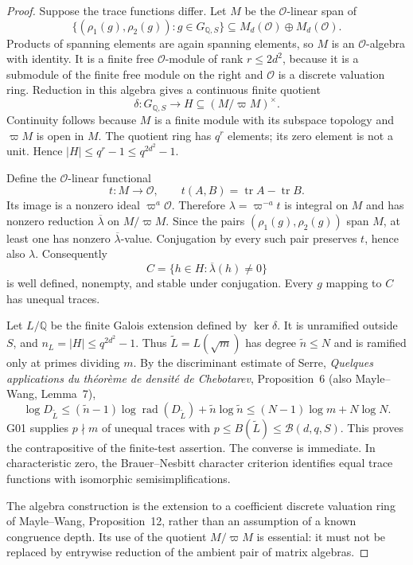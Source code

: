 \documentclass[11pt,a4paper]{article}
\begin{document}
\begin{proof}
Suppose the trace functions differ.  Let $M$ be the $\mathcal O$-linear span of
\[
 \{(\rho_1(g),\rho_2(g)):g\in G_{\mathbb Q,S}\}
 \subseteq M_d(\mathcal O)\oplus M_d(\mathcal O).
\]
Products of spanning elements are again spanning elements, so $M$ is an $\mathcal O$-algebra with identity. It is a finite free $\mathcal O$-module of rank $r\le2d^2$, because it is a submodule of the finite free module on the right and $\mathcal O$ is a discrete valuation ring.  Reduction in this algebra gives a continuous finite quotient
\[
 \delta:G_{\mathbb Q,S}\longrightarrow H\subseteq(M/\varpi M)^\times.
\]
Continuity follows because $M$ is a finite module with its subspace topology and $\varpi M$ is open in $M$.  The quotient ring has $q^r$ elements; its zero element is not a unit. Hence $|H|\le q^r-1\le q^{2d^2}-1$.

Define the $\mathcal O$-linear functional
\[
 t:M\longrightarrow\mathcal O,\qquad t(A,B)=\operatorname{tr}A-\operatorname{tr}B.
\]
Its image is a nonzero ideal $\varpi^a\mathcal O$. Therefore $\lambda=\varpi^{-a}t$ is integral on $M$ and has nonzero reduction $\overline\lambda$ on $M/\varpi M$. Since the pairs $(\rho_1(g),\rho_2(g))$ span $M$, at least one has nonzero $\overline\lambda$-value. Conjugation by every such pair preserves $t$, hence also $\lambda$. Consequently
\[
 C=\{h\in H:\overline\lambda(h)\ne0\}
\]
is well defined, nonempty, and stable under conjugation. Every $g$ mapping to $C$ has unequal traces.

Let $L/\mathbb Q$ be the finite Galois extension defined by $\ker\delta$. It is unramified outside $S$, and $n_L=|H|\le q^{2d^2}-1$. Thus $\widetilde L=L(\sqrt m)$ has degree $\widetilde n\le N$ and is ramified only at primes dividing $m$. By the discriminant estimate of Serre, \emph{Quelques applications du th\'eor\`eme de densit\'e de Chebotarev}, Proposition~6 (also Mayle--Wang, Lemma~7),
\[
 \log D_{\widetilde L}
 \le(\widetilde n-1)\log\operatorname{rad}(D_{\widetilde L})
       +\widetilde n\log\widetilde n
 \le(N-1)\log m+N\log N.
\]
G01 supplies $p\nmid m$ of unequal traces with $p\le B(\widetilde L)\le\mathcal B(d,q,S)$. This proves the contrapositive of the finite-test assertion. The converse is immediate.  In characteristic zero, the Brauer--Nesbitt character criterion identifies equal trace functions with isomorphic semisimplifications.

The algebra construction is the extension to a coefficient discrete valuation ring of Mayle--Wang, Proposition~12, rather than an assumption of a known congruence depth. Its use of the quotient $M/\varpi M$ is essential: it must not be replaced by entrywise reduction of the ambient pair of matrix algebras.
\end{proof}
\end{document}
